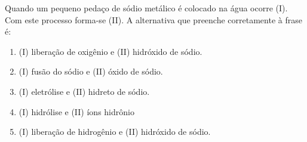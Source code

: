 Quando um pequeno pedaço de sódio metálico é colocado na água ocorre (I). Com este processo forma-se (II). A alternativa que preenche corretamente à frase é: 

\begin{enumerate}[label = (\alph*)]
	\item (I) liberação de oxigênio e (II) hidróxido de sódio.
	\item (I) fusão do sódio e (II) óxido de sódio.
	\item (I) eletrólise e (II) hidreto de sódio. 
	\item (I) hidrólise e (II) íons hidrônio
	\item (I) liberação de hidrogênio e (II) hidróxido de sódio.
\end{enumerate}
